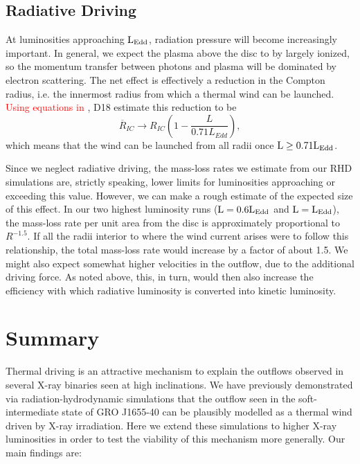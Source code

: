 \documentclass[a4paper,fleqn,usenatbib]{mnras}
\begin{document}
\subsection{Radiative Driving}
\label{section:radiative_driving}

At luminosities approaching $\rm{L_{Edd}}$, radiation pressure will
become increasingly important. In general, we expect the plasma above
the disc to by largely ionized, so the momentum transfer between
photons and plasma will be dominated by electron scattering. The net
effect is effectively a reduction in the Compton radius, i.e. the
innermost radius from which a thermal wind can be
launched. \textcolor{red}{Using equations in \cite{2002ApJ...565..455P}},
 D18 estimate this reduction to be 
\begin{equation}
\overline{R}_{IC} \rightarrow R_{IC}\left(1-\frac{L}{0.71L_{Edd}}\right),
\end{equation}
which means that the wind can be launched from all radii once 
$\rm{L \geq 0.71L_{Edd}}$.

Since we neglect radiative driving, the mass-loss rates we estimate from
our RHD simulations are, strictly speaking, lower limits for
luminosities approaching or exceeding this value. However, we can make
a rough estimate of the expected size of this effect. In our two
highest luminosity runs ($\rm{L = 0.6L_{Edd}}$ and $\rm{L =
L_{Edd}}$), the mass-loss rate per unit area from the disc is
approximately proportional to $R^{-1.5}$. If all the radii interior to
where the wind current arises were to follow this relationship, the
total mass-loss rate would increase by a factor of about 1.5.  We
might also expect somewhat higher velocities in the outflow, due to
the additional driving force. As noted above, this, in turn, would
then also increase the efficiency with which radiative luminosity is
converted into kinetic luminosity.

\section{Summary}

Thermal driving is an attractive mechanism to explain the outflows
observed in several X-ray binaries seen at high inclinations. We have
previously demonstrated via radiation-hydrodynamic simulations that
the outflow seen in the soft-intermediate state of GRO J1655-40 can be plausibly
modelled as a thermal wind driven by X-ray irradiation. Here we extend
these simulations to higher X-ray luminosities in order to test the
viability of this mechanism more generally. Our main findings are:
\end{document}
